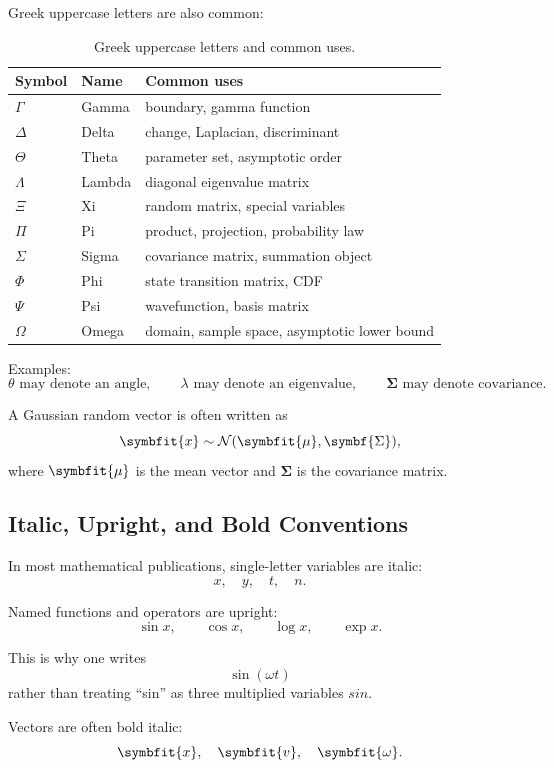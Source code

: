 \documentclass[11pt,twocolumn]{article}
\newcommand{\vct}[1]{\symbfit{#1}}   %
\newcommand{\mat}[1]{\symbf{#1}}     %
\newcommand{\Normal}{\mathcal{N}}
\begin{document}
Greek uppercase letters are also common:

\begin{table}[ht]
\centering
\caption{Greek uppercase letters and common uses.}
\begin{tabular}{lll}
\toprule
Symbol & Name & Common uses \\
\midrule
$\Gamma$ & Gamma & boundary, gamma function \\
$\Delta$ & Delta & change, Laplacian, discriminant \\
$\Theta$ & Theta & parameter set, asymptotic order \\
$\Lambda$ & Lambda & diagonal eigenvalue matrix \\
$\Xi$ & Xi & random matrix, special variables \\
$\Pi$ & Pi & product, projection, probability law \\
$\Sigma$ & Sigma & covariance matrix, summation object \\
$\Phi$ & Phi & state transition matrix, CDF \\
$\Psi$ & Psi & wavefunction, basis matrix \\
$\Omega$ & Omega & domain, sample space, asymptotic lower bound \\
\bottomrule
\end{tabular}
\end{table}

Examples:
\[
\theta \text{ may denote an angle},
\qquad
\lambda \text{ may denote an eigenvalue},
\qquad
\mat{\Sigma} \text{ may denote covariance}.
\]

A Gaussian random vector is often written as
\[
\vct{x} \sim \Normal(\vct{\mu},\mat{\Sigma}),
\]
where \(\vct{\mu}\) is the mean vector and \(\mat{\Sigma}\) is the covariance
matrix.

\subsection{Italic, Upright, and Bold Conventions}

In most mathematical publications, single-letter variables are italic:
\[
x,\quad y,\quad t,\quad n.
\]

Named functions and operators are upright:
\[
\sin x,
\qquad
\cos x,
\qquad
\log x,
\qquad
\exp x.
\]

This is why one writes
\[
\sin(\omega t)
\]
rather than treating ``sin'' as three multiplied variables \(s i n\).

Vectors are often bold italic:
\[
\vct{x},\quad \vct{v},\quad \vct{\omega}.
\]
\end{document}
